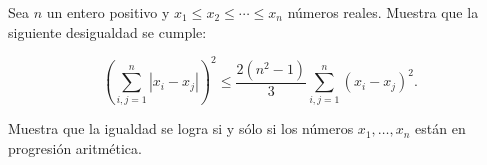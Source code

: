 Sea $n$ un entero positivo y $x_1\le x_2\le\cdots\le x_n$ números reales. Muestra que la siguiente desigualdad se cumple:

\[ \left(\sum_{i,j=1}^{n}|x_i-x_j|\right)^2\le\frac{2(n^2-1)}{3}\sum_{i,j=1}^{n}(x_i-x_j)^2. \]

Muestra que la igualdad se logra si y sólo si los números $x_1, \ldots, x_n$ están en progresión aritmética.